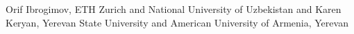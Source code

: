 Orif Ibrogimov, ETH Zurich and National University of Uzbekistan and Karen Keryan, Yerevan State University and American University of Armenia, Yerevan